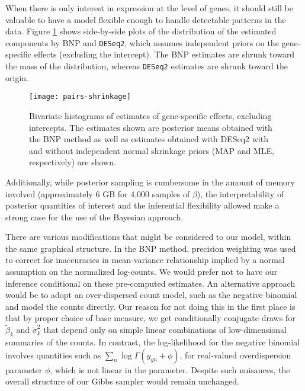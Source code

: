 When there is only interest in expression at the level of genes, it should still be valuable to have a model flexible enough to handle detectable patterns in the data. Figure \ref{all-shrink} shows side-by-side plots of the distribution of the estimated components by BNP and \texttt{DESeq2}, which assumes independent priors on the gene-specific effects (excluding the intercept). The BNP estimates are shrunk toward the mass of the distribution, whereas \texttt{DESeq2} estimates are shrunk toward the origin.


\begin{landscape}
\begin{figure}
\centering
\texttt{[image: pairs-shrinkage]}
\caption{Bivariate histograms of estimates of gene-specific effects, excluding intercepts. The estimates shown are posterior means obtained with the BNP method as well as estimates obtained with DESeq2 with and without independent normal shrinkage priors (MAP and MLE, respectively) are shown.}
\label{all-shrink}
\end{figure}
\end{landscape}

Additionally, while posterior sampling is cumbersome in the amount of memory involved (approximately 6 GB for 4,000 samples of $\beta$), the interpretability of posterior quantities of interest and the inferential flexibility allowed make a strong case for the use of the Bayesian approach.



There are various modifications that might be considered to our model, within the same graphical structure. In the BNP method, precision weighting was used to correct for inaccuracies in mean-variance relationship implied by a normal assumption on the normalized log-counts. We would prefer not to have our inference conditional on these pre-computed estimates. An alternative approach would be to adopt an over-dispersed count model, such as the negative binomial and model the counts directly. Our reason for not doing this in the first place is that by proper choice of base measure, we get conditionally conjugate draws for $\tilde{\beta}_k$ and $\tilde{\sigma}^2_k$ that depend only on simple linear combinations of low-dimensional summaries of the counts. In contrast, the log-likelihood for the negative binomial involves quantities such as $\sum_n \log \Gamma(y_{gn}+\phi)$, for real-valued overdispersion parameter $\phi$, which is not linear in the parameter. Despite such nuisances, the overall structure of our Gibbs sampler would remain unchanged.


